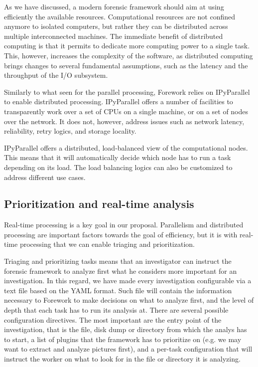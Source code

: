 \documentclass[twoside]{article}
\begin{document}
\begin{multicols}{2}
As we have discussed, a modern forensic framework should aim at using
efficiently the available resources. Computational resources are not
confined anymore to isolated computers, but rather they can be distributed
across multiple interconnected machines.
The immediate benefit of distributed computing is that it permits to dedicate
more computing power to a single task. This, however, increases the complexity
of the software, as distributed computing brings changes to several fundamental
assumptions, such as the latency and the throughput of the I/O subsystem.

Similarly to what seen for the parallel processing, Forework relies on IPyParallel
to enable distributed processing. IPyParallel offers a number of facilities to
transparently work over a set of CPUs on a single machine, or on a set of nodes
over the network. It does not, however, address issues such as network latency,
reliability, retry logics, and storage locality.

IPyParallel offers a distributed, load-balanced view of the computational nodes.
This means that it will automatically decide which node has to run a task
depending on its load. The load balancing logics can also be customized to
address different use cases.


\subsection*{Prioritization and real-time analysis}
\label{ssec:section_prioritization}
Real-time processing is a key goal in our proposal. Parallelism and
distributed processing are important factors towards the goal of efficiency, but
it is with real-time processing that we can enable triaging and prioritization.

Triaging and prioritizing tasks means that an investigator can instruct the
forensic framework to analyze first what he considers more important for an
investigation.
In this regard, we have made every investigation configurable via a text file
based on the YAML format. Such file will contain the information necessary to
Forework to make decisions on what to analyze first, and the level of depth that
each task has to run its analysis at.
There are several possible configuration directives. The most important are
the entry point of the investigation, that is the file, disk dump or directory
from which the analys has to start, a list of plugins that the framework has to
prioritize on (e.g. we may want to extract and analyze pictures first), and a
per-task configuration that will instruct the worker on what to look for in
the file or directory it is analyzing.


\end{multicols}
\end{document}

